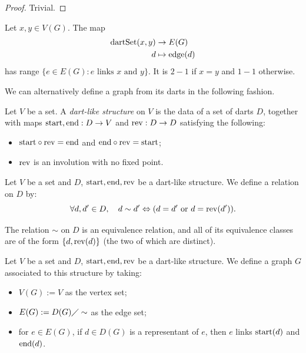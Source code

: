 \begin{proof}
  \leanok
  Trivial.
\end{proof}

\begin{lemma}
  \label{lem:edge_range_of_darset}
  Let $x, y \in V(G)$.
  The map
  \begin{equation*}
    \begin{split}
      \mathrm{dartSet}(x,y) & \rightarrow E(G) \\
      d & \mapsto \mathrm{edge}(d)
    \end{split}
  \end{equation*}
  has range $\{e \in E(G) : e \text{ links } x \text{ and } y\}$.
  It is $2-1$ if $x=y$ and $1-1$ otherwise.
\end{lemma}

We can alternatively define a graph from its darts in the following fashion.

\begin{definition}
  \label{def:dartlike}
  Let $V$ be a set. A \emph{dart-like structure} on $V$ is the data of a set of darts $D$,
  together with maps $\mathrm{start}, \mathrm{end} : D \rightarrow V$ and
  $\mathrm{rev} : D \rightarrow D$ satisfying the following:
  \begin{itemize}
    \item $\mathrm{start} \circ \mathrm{rev} = \mathrm{end}$ and $\mathrm{end} \circ \mathrm{rev} = \mathrm{start}$;
    \item $\mathrm{rev}$ is an involution with no fixed point.
  \end{itemize}
\end{definition}

\begin{definition}
  \label{def:dart_eq_rel}
  Let $V$ be a set and $D$, $\mathrm{start}, \mathrm{end}, \mathrm{rev}$ be a dart-like structure.
  We define a relation on $D$ by:
  \begin{equation*}
    \forall d, d' \in D,
    \quad d \sim d' \Leftrightarrow (d=d' \text{ or } d = \mathrm{rev}(d')).
  \end{equation*}
\end{definition}

\begin{lemma}
  \label{lem:dart_eq_rel}
  The relation $\sim$ on $D$ is an equivalence relation, and all of its equivalence
  classes are of the form $\{d, \mathrm{rev}(d)\}$ (the two of which are distinct).
\end{lemma}

\begin{definition}
  \label{def:graph_of_dart}
  Let $V$ be a set and $D$, $\mathrm{start}, \mathrm{end}, \mathrm{rev}$ be a dart-like structure.
  We define a graph $G$ associated to this structure by taking:
  \begin{itemize}
    \item $V(G) := V$ as the vertex set;
    \item $E(G) := D(G) \diagup \sim$ as the edge set;
    \item for $e \in E(G)$, if $d \in D(G)$ is a representant of $e$,
    then $e$ links $\mathrm{start}(d)$ and $\mathrm{end}(d)$.
  \end{itemize}
\end{definition}

